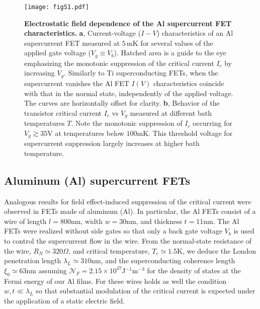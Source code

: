 \documentclass[prl,twocolumn,reprint,graphicx,showpacs,superscriptaddress,floatfix]{revtex4-1}
\begin{document}
\begin{figure}[t!]
\begin{center}
\texttt{[image: figS1.pdf]}\vspace{-3mm}
\caption{\textbf{Electrostatic field dependence of the Al supercurrent FET characteristics.} 
\textbf{a}, Current-voltage ($I-V$) characteristics of an Al supercurrent FET measured at $5\,$mK for several values of the applied gate voltage ($V_g\equiv V_b$). 
Hatched area is a guide to the eye emphasizing the monotonic suppression of the critical current $I_c$ by increasing $V_g$. 
Similarly to Ti superconducting FETs, when the supercurrent vanishes the Al FET $I(V)$ characteristics  coincide with that in the normal state, independently of the applied voltage.
The curves are horizontally offset for clarity. 
\textbf{b}, Behavior of the transistor critical current $I_c$ vs $V_g$  measured at different bath temperatures $T$. 
Note the monotonic suppression of $I_c$ occurring for  $V_g\gtrsim 35$V at temperatures below $100$mK. 
This threshold voltage for supercurrent suppression largely increases at higher bath temperature.
}
\label{figS1}
\end{center}
\end{figure}

\subsection{Aluminum (Al) supercurrent FETs}

Analogous results for field effect-induced suppression of the critical current were observed in FETs made of aluminum (Al). 
In particular, the Al FETs  consist of a wire of length $l=800$nm, width $w=30$nm, and thickness $t=11$nm. 
The Al FETs were realized without side gates so that only a back gate voltage $V_b$ is used to control the supercurrent flow in the wire. 
From the normal-state resistance of the wire, $R_N\simeq 320\Omega$, and critical temperature, $T_c\simeq 1.5$K, we deduce the London penetration length $\lambda_L \simeq 310$nm,  and the superconducting coherence length $\xi_0\simeq 63$nm assuming $\mathcal{N}_F=2.15\times 10^{47}$J$^{-1}$m$^{-3}$ for the density of states at the Fermi energy of our Al films. 
For these wires holds as well the condition $w,t\ll \lambda_L$ so that substantial modulation of the critical current is expected under the application of a static electric field.
\end{document}
